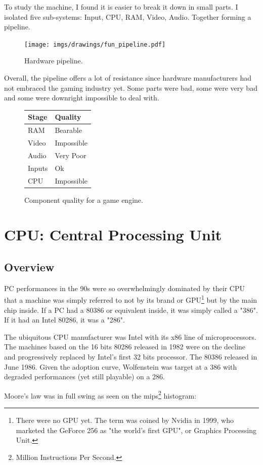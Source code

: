 \documentclass[book.tex]{subfiles}
\begin{document}
To study the machine, I found it is easier to break it down in small parts. I isolated five sub-systems: Input, CPU, RAM, Video, Audio. Together forming a pipeline.\\
\begin{figure}[H]
\centering
\texttt{[image: imgs/drawings/fun\_pipeline.pdf]}
\caption{Hardware pipeline.}
\label{fig:digraph}
\end{figure}

Overall, the pipeline offers a lot of resistance since hardware manufacturers had not embraced the gaming industry yet. Some parts were bad, some were very bad and some were downright impossible to deal with.\\
\par

\begin{figure}[H]
\centering
\begin{tabularx}{\textwidth}{ X X  }
  \toprule
  \textbf{Stage} & \textbf{Quality} \\ \bottomrule
  RAM & Bearable \\ 
  Video & Impossible \\ 
  Audio & Very Poor \\ 
  Inputs & Ok \\ 
  CPU & Impossible \\ \bottomrule
\end{tabularx}
\caption{Component quality for a game engine.}
\end{figure}



\section{CPU: Central Processing Unit}
  \subsection{Overview}
  PC performances in the 90s were so overwhelmingly dominated by their CPU that a machine was simply referred to not by its brand or GPU\footnote{There were no GPU yet. The term was coined by Nvidia in 1999, who marketed the GeForce 256 as "the world's first GPU", or Graphics Processing Unit.} but by the main chip inside. If a PC had a 80386 or equivalent inside, it was simply called a "386". If it had an Intel 80286, it was a "286".\\
\par
  The ubiquitous CPU manufacturer was Intel with its x86 line of microprocessors. The machines based on the 16 bits 80286 released in 1982 were on the decline and progressively replaced by Intel's first 32 bits processor. The 80386 released in June 1986. Given the adoption curve, Wolfenstein was target at a 386 with degraded performances (yet still playable) on a 286.\\
\par
  Moore's law was in full swing as seen on the mips\footnote{Million Instructions Per Second.} histogram:
\end{document}
